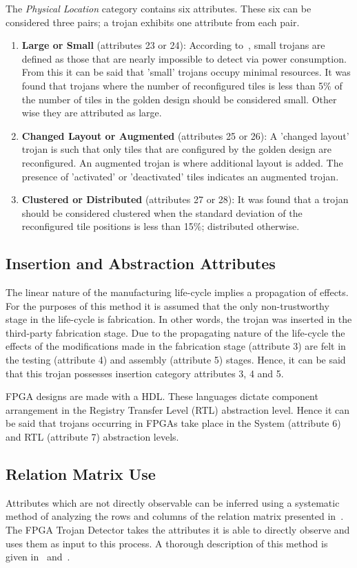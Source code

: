 \documentclass[journal, hidelinks]{IEEEtran}
\begin{document}
The \textit{Physical Location} category contains six attributes.
These six can be considered three pairs; a trojan exhibits one attribute from each pair. 
\begin{enumerate}
	\item \textbf{Large or Small} (attributes 23 or 24): According to~\cite{samerAttribute}, small trojans are defined as those that are nearly impossible to detect via power consumption. From this it can be said that 'small' trojans occupy minimal resources. It was found that trojans where the number of reconfigured tiles is less than 5\% of the number of tiles in the golden design should be considered small. Other wise they are attributed as large.
	\item \textbf{Changed Layout or Augmented} (attributes 25 or 26): A 'changed layout' trojan is such that only tiles that are configured by the golden design are reconfigured. An augmented trojan is where additional layout is added. The presence of 'activated' or 'deactivated' tiles indicates an augmented trojan. 
	\item \textbf{Clustered or Distributed} (attributes 27 or 28): It was found that a trojan should be considered clustered when the standard deviation of the reconfigured tile positions is less than 15\%; distributed otherwise.
\end{enumerate}
\subsection{Insertion and Abstraction Attributes}
The linear nature of the manufacturing life-cycle implies a propagation of effects.
For the purposes of this method it is assumed that the only non-trustworthy stage in the life-cycle is fabrication.
In other words, the trojan was inserted in the third-party fabrication stage.
Due to the propagating nature of the life-cycle the effects of the modifications made in the fabrication stage (attribute 3) are felt in the testing (attribute 4) and assembly (attribute 5) stages.
Hence, it can be said that this trojan possesses insertion category attributes 3, 4 and 5.

FPGA designs are made with a HDL.
These languages dictate component arrangement in the Registry Transfer Level (RTL) abstraction level.
Hence it can be said that trojans occurring in FPGAs take place in the System (attribute 6) and RTL (attribute 7) abstraction levels.

\subsection{Relation Matrix Use} \label{sec:matrixUse}
Attributes which are not directly observable can be inferred using a systematic method of analyzing the rows and columns of the relation matrix presented in~\cite{samerAttribute}.
The FPGA Trojan Detector takes the attributes it is able to directly observe and uses them as input to this process.
A thorough description of this method is given in~\cite{samerDissertation} and~\cite{meCategorization}.
\end{document}
